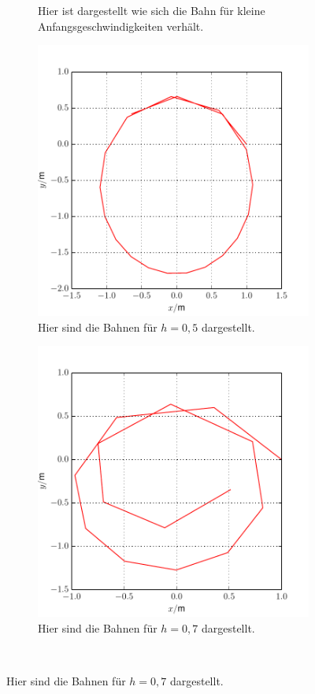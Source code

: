 \begin{figure}[h!]
\begin{subfigure}[c]{0.5\textwidth}
		\caption{ Hier ist dargestellt wie sich die Bahn für kleine Anfangsgeschwindigkeiten verhält. \label{fig:Bahn3}}
	\end{subfigure}
	\begin{subfigure}[c]{0.5\textwidth}
		\includegraphics[width = \textwidth]{../Plots/Plot_4_A_3.pdf}
		\caption{ Hier sind die Bahnen für $h=0,5$ dargestellt.}
	\end{subfigure}
	\begin{subfigure}[c]{0.5\textwidth}	
		\includegraphics[width = \textwidth]{../Plots/Plot_4_A_4.pdf}
		\caption{ Hier sind die Bahnen für $h=0,7$ dargestellt.\label{fig:Bahn2}}
	\end{subfigure}\\
\end{figure}
